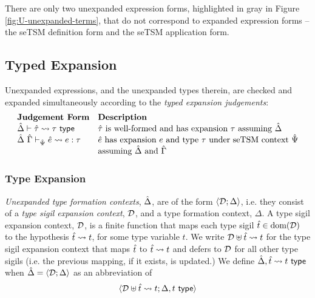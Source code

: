 There are only two unexpanded expression forms, highlighted in gray in Figure \ref{fig:U-unexpanded-terms}, that do not correspond to expanded expression forms -- the seTSM definition form and the seTSM application form. %


\subsection{Typed Expansion}\label{sec:typed-expansion-U}
Unexpanded expressions, and the unexpanded types therein, are checked and expanded simultaneously according to the \emph{typed expansion judgements}:
\[\begin{array}{ll}
\textbf{Judgement Form} & \textbf{Description}\\
\hat{\Delta} \vdash {\hat\tau} \leadsto \tau~\mathsf{type} & \text{${\hat\tau}$ is well-formed and has expansion $\tau$ assuming $\hat{\Delta}$}\\
\hat{\Delta}~\hat{\Gamma} \vdash_{\hat{\Psi}} {\hat e} \leadsto e : \tau & \text{${\hat e}$ has expansion $e$ and type $\tau$ under seTSM context $\hat{\Psi}$}\\
& \text{assuming $\hat{\Delta}$ and $\hat{\Gamma}$}
\end{array}\]

\subsubsection{Type Expansion}
\emph{Unexpanded type formation contexts}, $\hat{\Delta}$, are of the form $\langle \mathcal{D}; \Delta \rangle$, i.e. they consist of a \emph{type sigil expansion context}, $\mathcal{D}$, and a type formation context, $\Delta$. A type sigil expansion context, $\mathcal{D}$, is a finite function that maps each type sigil ${\hat{t}} \in \text{dom}(\mathcal{D})$ to the hypothesis ${\hat{t}} \leadsto t$, for some type variable $t$. We write $\mathcal{D} \uplus {\hat{t}} \leadsto t$ for the type sigil expansion context that maps ${\hat{t}}$ to ${\hat{t}} \leadsto t$ and defers to $\mathcal{D}$ for all other type sigils (i.e. the previous mapping, if it exists, is updated.) We define $\hat{\Delta}, {\hat{t}} \leadsto t~\mathsf{type}$ when $\hat{\Delta}=\langle \mathcal{D}; \Delta \rangle$ as an abbreviation of  \[\langle \mathcal{D} \uplus {\hat{t}} \leadsto t; \Delta, t~\mathsf{type} \rangle\]%

